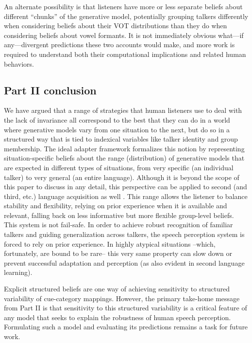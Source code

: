 An alternate possibility is that listeners have more or less separate beliefs about different ``chunks'' of the generative model, potentially grouping talkers differently when considering beliefs about their VOT distributions than they do when considering beliefs about vowel formants.  It is not immediately obvious what---if any---divergent predictions these two accounts would make, and more work is required to understand both their computational implications and related human behaviors.

\label{r1-cluster-questions-end}

\subsection{Part II conclusion}
\label{sec:part-ii-conclusion}

We have argued that a range of strategies that human listeners use to deal with the lack of invariance all correspond to the best that they can do in a world where generative models vary from one situation to the next, but do so in a structured way that is tied to indexical variables like talker identity and group membership.  The ideal adapter framework formalizes this notion by representing situation-specific beliefs about the range (distribution) of generative models that are expected in different types of situations, from very specific (an individual talker) to very general (an entire language).%
Although it is beyond the scope of this paper to discuss in any detail, this perspective can be applied to second (and third, etc.) language acquisition as well \autocite{Pajak2016}.
This range allows the listener to balance stability and flexibility, relying on prior experience when it is available and relevant, falling back on less informative but more flexible group-level beliefs. This system is not fail-safe. In order to achieve robust recognition of familiar talkers and guiding generalization across talkers, the speech perception system is forced to rely on prior experience. In highly atypical situations --which, fortunately, are bound to be rare-- this very same property can slow down or prevent successful adaptation and perception (as also evident in second language learning). 

Explicit structured beliefs are one way of achieving sensitivity to structured variability of cue-category mappings. However, the primary take-home message from Part II is that sensitivity to this structured variability is a critical feature of any model that seeks to explain the robustness of human speech perception.  Formulating such a model and evaluating its predictions remains a task for future work.


